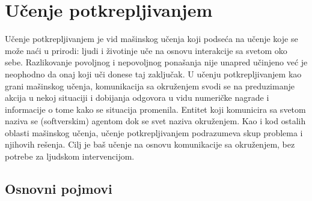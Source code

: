 \chapter{Učenje potkrepljivanjem}
\label{ch:rl}

Učenje potkrepljivanjem je vid mašinskog učenja koji podseća na učenje koje se može naći u prirodi: ljudi i životinje uče na osnovu interakcije sa svetom oko sebe. Razlikovanje povoljnog i nepovoljnog ponašanja nije unapred učinjeno već je neophodno da onaj koji uči donese taj zaključak. U učenju potkrepljivanjem kao grani mašinskog učenja, komunikacija sa okruženjem svodi se na preduzimanje akcija u nekoj situaciji i dobijanja odgovora u vidu numeričke nagrade i informacije o tome kako se situacija promenila. Entitet koji komunicira sa svetom naziva se (softverskim) agentom dok se svet naziva okruženjem. Kao i kod ostalih oblasti mašinskog učenja, učenje potkrepljivanjem podrazumeva skup problema i njihovih rešenja. Cilj je baš učenje na osnovu komunikacije sa okruženjem, bez potrebe za ljudskom intervencijom.


\section{Osnovni pojmovi}

